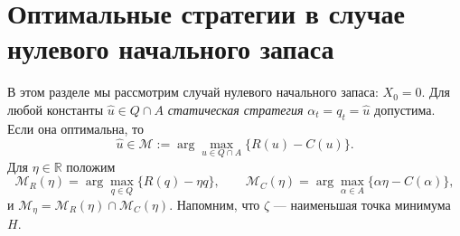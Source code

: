 \section{Оптимальные стратегии в случае нулевого начального запаса} \label{sec:3.3}
В этом разделе мы рассмотрим случай нулевого начального запаса: $X_0=0$. Для любой константы $\widehat u\in Q\cap A$ \emph{статическая стратегия} $\alpha_t=q_t= \widehat u$ допустима. Если она оптимальна, то
\begin{equation} \label{eq:3.3.1}
\widehat u\in\mathscr M:=\arg\max_{u\in Q\cap A}\{R(u)-C(u)\}.
\end{equation}
Для $\eta\in\mathbb R$ положим
$$\mathscr M_R(\eta)=\arg\max_{q\in Q}\{R(q)-\eta q\},\qquad
  \mathscr M_C(\eta)=\arg\max_{\alpha\in A}\{\alpha\eta-C(\alpha)\},$$
и $\mathscr M_\eta=\mathscr M_R(\eta)\cap\mathscr M_C(\eta)$. Напомним, что $\zeta$ --- наименьшая точка минимума $H$.

